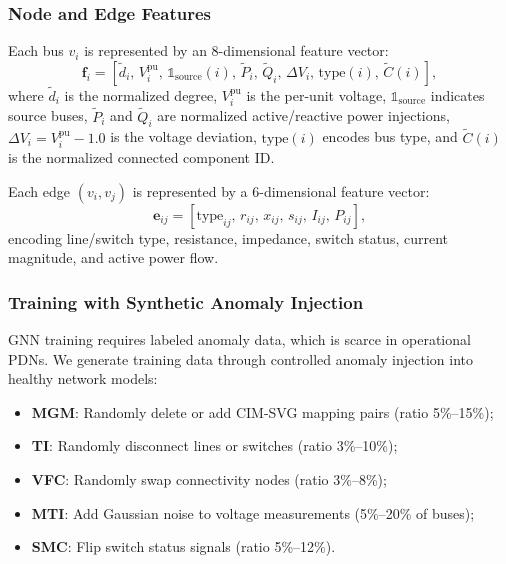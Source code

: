 \documentclass[research]{fcs}
\begin{document}
\subsubsection{Node and Edge Features}

Each bus $v_i$ is represented by an 8-dimensional feature vector:
\begin{equation}
\mathbf{f}_i = [\tilde{d}_i,\, V_i^{\text{pu}},\, \mathbb{1}_{\text{source}}(i),\, \tilde{P}_i,\, \tilde{Q}_i,\, \Delta V_i,\, \text{type}(i),\, \tilde{C}(i)],
\end{equation}
where $\tilde{d}_i$ is the normalized degree, $V_i^{\text{pu}}$ is the per-unit voltage, $\mathbb{1}_{\text{source}}$ indicates source buses, $\tilde{P}_i$ and $\tilde{Q}_i$ are normalized active/reactive power injections, $\Delta V_i = V_i^{\text{pu}} - 1.0$ is the voltage deviation, $\text{type}(i)$ encodes bus type, and $\tilde{C}(i)$ is the normalized connected component ID.

Each edge $(v_i, v_j)$ is represented by a 6-dimensional feature vector:
\begin{equation}
\mathbf{e}_{ij} = [\text{type}_{ij},\, r_{ij},\, x_{ij},\, s_{ij},\, I_{ij},\, P_{ij}],
\end{equation}
encoding line/switch type, resistance, impedance, switch status, current magnitude, and active power flow.

\subsubsection{Training with Synthetic Anomaly Injection}

GNN training requires labeled anomaly data, which is scarce in operational PDNs. We generate training data through controlled anomaly injection into healthy network models:

\begin{itemize}
\item \textbf{MGM}: Randomly delete or add CIM-SVG mapping pairs (ratio 5\%--15\%);
\item \textbf{TI}: Randomly disconnect lines or switches (ratio 3\%--10\%);
\item \textbf{VFC}: Randomly swap connectivity nodes (ratio 3\%--8\%);
\item \textbf{MTI}: Add Gaussian noise to voltage measurements (5\%--20\% of buses);
\item \textbf{SMC}: Flip switch status signals (ratio 5\%--12\%).
\end{itemize}
\end{document}
